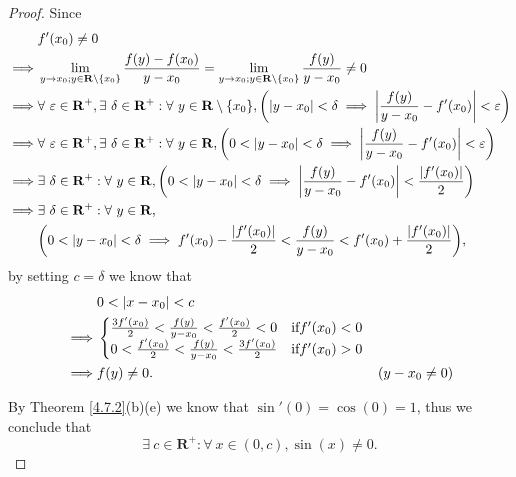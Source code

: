 \begin{proof}
    Since
    \begin{align*}
                 & f'(x_0) \neq 0                                                                                                                                                                                                          \\
        \implies & \lim_{y \to x_0 ; y \in \mathbf{R} \setminus \{x_0\}} \frac{f(y) - f(x_0)}{y - x_0} = \lim_{y \to x_0 ; y \in \mathbf{R} \setminus \{x_0\}} \frac{f(y)}{y - x_0} \neq 0                                                 \\
        \implies & \forall\ \varepsilon \in \mathbf{R}^+, \exists\ \delta \in \mathbf{R}^+ : \forall\ y \in \mathbf{R} \setminus \{x_0\}, \bigg(\abs*{y - x_0} < \delta \implies \abs*{\frac{f(y)}{y - x_0} - f'(x_0)} < \varepsilon\bigg) \\
        \implies & \forall\ \varepsilon \in \mathbf{R}^+, \exists\ \delta \in \mathbf{R}^+ : \forall\ y \in \mathbf{R}, \bigg(0 < \abs*{y - x_0} < \delta \implies \abs*{\frac{f(y)}{y - x_0} - f'(x_0)} < \varepsilon\bigg)               \\
        \implies & \exists\ \delta \in \mathbf{R}^+ : \forall\ y \in \mathbf{R}, \bigg(0 < \abs*{y - x_0} < \delta \implies \abs*{\frac{f(y)}{y - x_0} - f'(x_0)} < \frac{\abs*{f'(x_0)}}{2}\bigg)                                         \\
        \implies & \exists\ \delta \in \mathbf{R}^+ : \forall\ y \in \mathbf{R},                                                                                                                                                           \\
                 & \bigg(0 < \abs*{y - x_0} < \delta \implies f'(x_0) - \frac{\abs*{f'(x_0)}}{2} < \frac{f(y)}{y - x_0} < f'(x_0) + \frac{\abs*{f'(x_0)}}{2}\bigg),
    \end{align*}
    by setting \(c = \delta\) we know that
    \begin{align*}
                 & 0 < \abs*{x - x_0} < c                        \\
        \implies & \begin{cases}
            \frac{3 f'(x_0)}{2} < \frac{f(y)}{y - x_0} < \frac{f'(x_0)}{2} < 0 & \text{if} f'(x_0) < 0 \\
            0 < \frac{f'(x_0)}{2} < \frac{f(y)}{y - x_0} < \frac{3 f'(x_0)}{2} & \text{if} f'(x_0) > 0
        \end{cases}                    \\
        \implies & f(y) \neq 0.               & (y - x_0 \neq 0)
    \end{align*}

    By Theorem \ref{4.7.2}(b)(e) we know that \(\sin'(0) = \cos(0) = 1\), thus we conclude that
    \[
        \exists\ c \in \mathbf{R}^+ : \forall\ x \in (0, c), \sin(x) \neq 0.
    \]
\end{proof}

